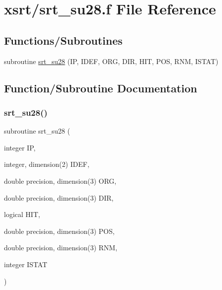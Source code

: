 \hypertarget{srt__su28_8f}{}\section{xsrt/srt\+\_\+su28.f File Reference}
\label{srt__su28_8f}
\subsection*{Functions/\+Subroutines}
\begin{DoxyCompactItemize}
\item 
subroutine \hyperlink{srt__su28_8f_ad84fc526263cf2f943af831346fa6b71}{srt\+\_\+su28} (IP, I\+D\+EF, O\+RG, D\+IR, H\+IT, P\+OS, R\+NM, I\+S\+T\+AT)
\end{DoxyCompactItemize}


\subsection{Function/\+Subroutine Documentation}
\mbox{\label{srt__su28_8f_ad84fc526263cf2f943af831346fa6b71}} 
\subsubsection{\texorpdfstring{srt\+\_\+su28()}{srt\_su28()}}
{\footnotesize\ttfamily subroutine srt\+\_\+su28 (\begin{DoxyParamCaption}\item[{integer}]{IP,  }\item[{integer, dimension(2)}]{I\+D\+EF,  }\item[{double precision, dimension(3)}]{O\+RG,  }\item[{double precision, dimension(3)}]{D\+IR,  }\item[{logical}]{H\+IT,  }\item[{double precision, dimension(3)}]{P\+OS,  }\item[{double precision, dimension(3)}]{R\+NM,  }\item[{integer}]{I\+S\+T\+AT }\end{DoxyParamCaption})}

